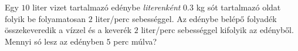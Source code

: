 Egy $10$ liter vizet tartalmazó edénybe {\it literenként} $0.3$ kg sót
tartalmazó oldat folyik be folyamatosan $2$ liter/perc sebességgel.
Az edénybe belépő folyadék összekeveredik a vízzel és a
keverék $2$ liter/perc sebességgel kifolyik az edényből. Mennyi só lesz az
edényben $5$ perc múlva?


